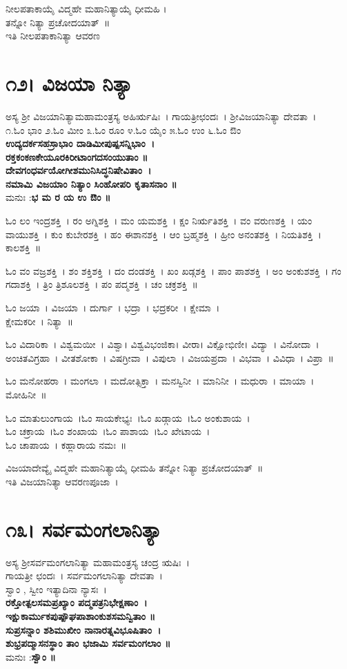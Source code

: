 ನೀಲಪತಾಕಾಯೈ ವಿದ್ಮಹೇ ಮಹಾನಿತ್ಯಾಯೈ ಧೀಮಹಿ ।\\ತನ್ನೋ ನಿತ್ಯಾ ಪ್ರಚೋದಯಾತ್~॥\\
ಇತಿ ನೀಲಪತಾಕಾನಿತ್ಯಾ ಆವರಣ
\section{೧೨। ವಿಜಯಾ ನಿತ್ಯಾ}
ಅಸ್ಯ ಶ್ರೀ ವಿಜಯಾನಿತ್ಯಾಮಹಾಮಂತ್ರಸ್ಯ ಅಹಿರ್ಋಷಿಃ~। ಗಾಯತ್ರೀಛಂದಃ~। ಶ್ರೀವಿಜಯಾನಿತ್ಯಾ ದೇವತಾ~।\\
೧.ಓಂ ಭಾಂ ೨.ಓಂ ಮೀಂ ೩.ಓಂ ರೂಂ ೪.ಓಂ ಯೈಂ ೫.ಓಂ ಉಂ ೬.ಓಂ ಔಂ \\
{\bfseries ಉದ್ಯದರ್ಕಸಹಸ್ರಾಭಾಂ ದಾಡಿಮೀಪುಷ್ಪಸನ್ನಿಭಾಂ~।\\
ರಕ್ತಕಂಕಣಕೇಯೂರಕಿರೀಟಾಂಗದಸಂಯುತಾಂ ॥\\
ದೇವಗಂಧರ್ವಯೋಗೀಶಮುನಿಸಿದ್ಧನಿಷೇವಿತಾಂ~।\\
ನಮಾಮಿ ವಿಜಯಾಂ ನಿತ್ಯಾಂ ಸಿಂಹೋಪರಿ ಕೃತಾಸನಾಂ ॥\\}
ಮನುಃ :{\bfseries ಭ ಮ ರ ಯ ಉ ಔಂ ॥}

ಓಂ ಲಂ ಇಂದ್ರಶಕ್ತಿ~। ರಂ ಅಗ್ನಿಶಕ್ತಿ~। ಮಂ ಯಮಶಕ್ತಿ~। ಕ್ಷಂ ನಿರ್ಋತಿಶಕ್ತಿ~। ವಂ ವರುಣಶಕ್ತಿ~। ಯಂ ವಾಯುಶಕ್ತಿ~। ಕುಂ ಕುಬೇರಶಕ್ತಿ~। ಹಂ ಈಶಾನಶಕ್ತಿ~। ಆಂ ಬ್ರಹ್ಮಶಕ್ತಿ~। ಹ್ರೀಂ ಅನಂತಶಕ್ತಿ~। ನಿಯತಿಶಕ್ತಿ~। ಕಾಲಶಕ್ತಿ~॥ 

ಓಂ ವಂ ವಜ್ರಶಕ್ತಿ~। ಶಂ ಶಕ್ತಿಶಕ್ತಿ~। ದಂ ದಂಡಶಕ್ತಿ~। ಖಂ ಖಡ್ಗಶಕ್ತಿ~। ಪಾಂ ಪಾಶಶಕ್ತಿ~। ಅಂ ಅಂಕುಶಶಕ್ತಿ~। ಗಂ ಗದಾಶಕ್ತಿ~। ತ್ರಿಂ ತ್ರಿಶೂಲಶಕ್ತಿ~। ಪಂ ಪದ್ಮಶಕ್ತಿ~। ಚಂ ಚಕ್ರಶಕ್ತಿ~॥ 

ಓಂ ಜಯಾ~। ವಿಜಯಾ~। ದುರ್ಗಾ~। ಭದ್ರಾ~। ಭದ್ರಕರೀ~। ಕ್ಷೇಮಾ~। \\ಕ್ಷೇಮಕರೀ~। ನಿತ್ಯಾ~॥ 

ಓಂ ವಿದಾರಿಕಾ~। ವಿಶ್ವಮಯೀ~। ವಿಶ್ವಾ। ವಿಶ್ವವಿಭಂಜಿಕಾ। ವೀರಾ। ವಿಕ್ಷೋಭಿಣೀ। ವಿದ್ಯಾ~। ವಿನೋದಾ~। ಅಂಚಿತವಿಗ್ರಹಾ~। ವೀತಶೋಕಾ~। ವಿಷಗ್ರೀವಾ~। ವಿಪುಲಾ~। ವಿಜಯಪ್ರದಾ~। ವಿಭವಾ~। ವಿವಿಧಾ~। ವಿಪ್ರಾ~॥ 

ಓಂ ಮನೋಹರಾ~। ಮಂಗಲಾ~। ಮದೋತ್ಸಿಕ್ತಾ~। ಮನಸ್ವಿನೀ~। ಮಾನಿನೀ~। ಮಧುರಾ~। ಮಾಯಾ~। ಮೋಹಿನೀ~॥ 

ಓಂ ಮಾತುಲುಂಗಾಯ~।ಓಂ ಸಾಯಕೇಭ್ಯಃ~।ಓಂ ಖಡ್ಗಾಯ~।ಓಂ ಅಂಕುಶಾಯ~।\\ಓಂ ಚಕ್ರಾಯ~।ಓಂ ಶಂಖಾಯ~।ಓಂ ಪಾಶಾಯ~।ಓಂ ಖೇಟಾಯ~।\\ಓಂ ಚಾಪಾಯ~। ಕಹ್ಲಾರಾಯ ನಮಃ~॥

ವಿಜಯಾದೇವ್ಯೈ ವಿದ್ಮಹೇ ಮಹಾನಿತ್ಯಾಯೈ ಧೀಮಹಿ ತನ್ನೋ ನಿತ್ಯಾ ಪ್ರಚೋದಯಾತ್~॥\\
ಇತಿ ವಿಜಯಾನಿತ್ಯಾ ಆವರಣಪೂಜಾ~।
\section{೧೩। ಸರ್ವಮಂಗಲಾನಿತ್ಯಾ}
ಅಸ್ಯ ಶ್ರೀಸರ್ವಮಂಗಲಾನಿತ್ಯಾ ಮಹಾಮಂತ್ರಸ್ಯ ಚಂದ್ರ ಋಷಿಃ~।\\ ಗಾಯತ್ರೀ ಛಂದಃ~। ಸರ್ವಮಂಗಲಾನಿತ್ಯಾ ದೇವತಾ~।\\
ಸ್ವಾಂ , ಸ್ವೀಂ ಇತ್ಯಾದಿನಾ ನ್ಯಾಸಃ~।\\
{\bfseries ರಕ್ತೋತ್ಪಲಸಮಪ್ರಖ್ಯಾಂ ಪದ್ಮಪತ್ರನಿಭೇಕ್ಷಣಾಂ~।\\
ಇಕ್ಷುಕಾರ್ಮುಕಪುಷ್ಪೌಘಪಾಶಾಂಕುಶಸಮನ್ವಿತಾಂ ॥\\
ಸುಪ್ರಸನ್ನಾಂ ಶಶಿಮುಖೀಂ ನಾನಾರತ್ನವಿಭೂಷಿತಾಂ~।\\
ಶುಭ್ರಪದ್ಮಾಸನಸ್ಥಾಂ ತಾಂ ಭಜಾಮಿ ಸರ್ವಮಂಗಲಾಂ ॥\\}
ಮನುಃ :{\bfseries ಸ್ವೌಂ ॥}

